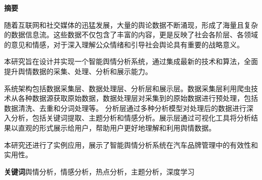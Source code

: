 \documentclass[UTF8,a4paper,15pt,titlepage,oneside]{ctexbook}
\begin{document}
\begin{titlepage}
  \vspace*{2cm}
  \begin{center}
    \textbf{摘要}

        

        \vspace{0.1cm}
        \end{center}

        随着互联网和社交媒体的迅猛发展，大量的舆论数据不断涌现，形成了海量且复杂的数据信息流。这些数据不仅包含了丰富的内容，更是反映了社会各阶层、各领域的意见和情感，对于深入理解公众情绪和引导社会舆论具有重要的战略意义。
        
        本研究旨在设计并实现一个智能舆情分析系统，通过集成最新的技术和算法，全面提升舆情数据的采集、处理、分析和展示能力。
        
        系统架构包括数据采集层、数据处理层、分析层和展示层。数据采集层利用爬虫技术从各种数据源获取原始数据，数据处理层对采集到的原始数据进行预处理，包括数据清洗、去重和分词处理等。
        分析层通过多种分析模型对处理后的数据进行深入分析，包括关键词提取、主题分析和情感分析。展示层通过可视化工具将分析结果以直观的形式展示给用户，帮助用户更好地理解和利用舆情数据。
        
        本研究还进行了实例应用，展示了智能舆情分析系统在汽车品牌管理中的有效性和实用性。
        
        \vspace{1cm}
        \noindent
        \textbf{关键词}\;\;舆情分析，情感分析，热点分析，主题分析，深度学习

\end{titlepage}
\newpage
\end{document}
